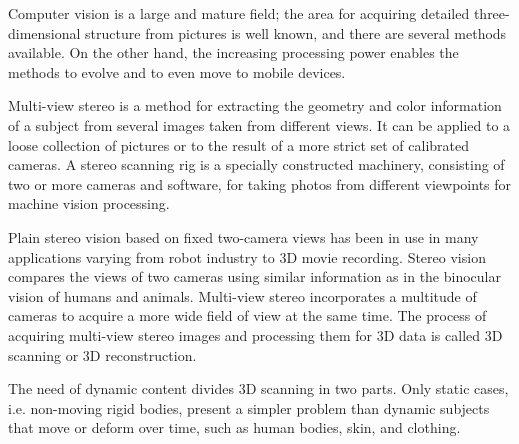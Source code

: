 Computer vision is a large and mature field; the area for acquiring detailed three-dimensional structure from pictures is well known, and there are several methods available.
On the other hand, the increasing processing power enables the methods to evolve and to even move to mobile devices.

Multi-view stereo is a method for extracting the geometry and color information of a subject from several images taken from different views.
It can be applied to a loose collection of pictures or to the result of a more strict set of calibrated cameras.
A stereo scanning rig is a specially constructed machinery, consisting of two or more cameras and software, for taking photos from different viewpoints for machine vision processing.

Plain stereo vision based on fixed two-camera views has been in use in many applications varying from robot industry to 3D movie recording.
Stereo vision compares the views of two cameras using similar information as in the binocular vision of humans and animals.
Multi-view stereo incorporates a multitude of cameras to acquire a more wide field of view at the same time.
The process of acquiring multi-view stereo images and processing them for 3D data is called 3D scanning or 3D reconstruction.



The need of dynamic content divides 3D scanning in two parts.
Only static cases, i.e. non-moving rigid bodies, present a simpler problem than dynamic subjects that move or deform over time, such as human bodies, skin, and clothing.

